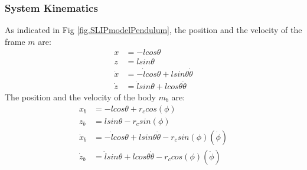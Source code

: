 \subsubsection{System Kinematics}
As indicated in Fig \ref{fig.SLIPmodelPendulum}, the position 
and the velocity of the frame $m$ are:
\begin{align*}
x &= -lcos\theta \\
z &= lsin\theta \\
	\dot x &= -\dot lcos\theta + lsin\theta\dot \theta \\
\dot z &= \dot lsin\theta + lcos\theta \dot{\theta}
\end{align*}
The position 
and the velocity of the body $m_b$ are:
\begin{align*}
x_b &= -lcos\theta + r_ccos(\phi)\\
z_b &= lsin\theta - r_csin(\phi)\\
\dot x_b &= -\dot lcos\theta +lsin\theta\dot \theta -  r_csin(\phi)(\dot\phi)\\
\dot z_b &= \dot lsin\theta + lcos\theta \dot{\theta} - r_ccos(\phi)(\dot\phi)\
\end{align*}





